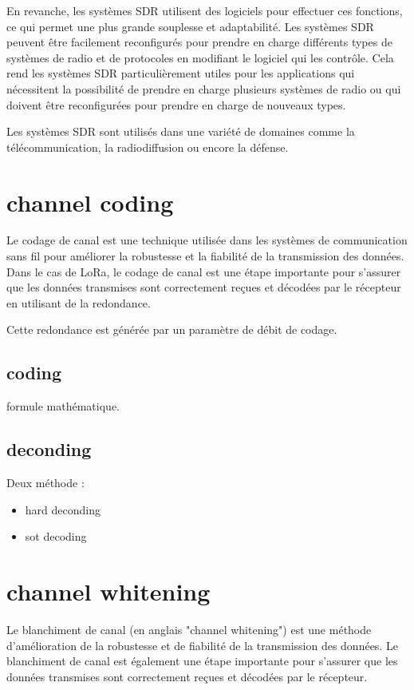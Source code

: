 \documentclass[12pt,a4paper,oneside, titlepage]{report}
\begin{document}
En revanche, les systèmes SDR utilisent des logiciels pour effectuer ces fonctions, ce qui permet une plus grande souplesse et adaptabilité. Les systèmes SDR peuvent être facilement reconfigurés pour prendre en charge différents types de systèmes de radio et de protocoles en modifiant le logiciel qui les contrôle. Cela rend les systèmes SDR particulièrement utiles pour les applications qui nécessitent la possibilité de prendre en charge plusieurs systèmes de radio ou qui doivent être reconfigurées pour prendre en charge de nouveaux types.

Les systèmes SDR sont utilisés dans une variété de domaines comme  la télécommunication, la radiodiffusion ou encore la défense.



\section{channel coding}

Le codage de canal est une technique utilisée dans les systèmes de communication sans fil pour améliorer la robustesse et la fiabilité de la transmission des données. Dans le cas de LoRa, le codage de canal est une étape importante pour s'assurer que les données transmises sont correctement reçues et décodées par le récepteur en utilisant de la redondance.

Cette redondance est générée par un paramètre de débit de codage.


\subsection{coding}

formule mathématique.

\subsection{deconding}

Deux méthode :

\begin{itemize}
\item hard deconding
\item sot decoding
\end{itemize}

\section{channel whitening}

Le blanchiment de canal (en anglais "channel whitening") est une méthode d'amélioration de la robustesse et de fiabilité de la transmission des données. Le blanchiment de canal est également une étape importante pour s'assurer que les données transmises sont correctement reçues et décodées par le récepteur.
\end{document}
